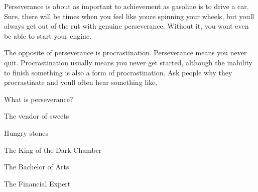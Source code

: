 \begin{questions}
{Perseverance is about as important to achievement as gasoline is to drive a car. Sure, there will be times when you feel like you\textquotesingle{}re spinning your wheels, but you\textquotesingle{}ll always get out of the rut with genuine perseverance. Without it, you won\textquotesingle{}t even be able to start your engine.



The opposite of perseverance is procrastination. Perseverance means you never quit. Procrastination usually means you never get started, although the inability to finish something is also a form of procrastination. Ask people why they procrastinate and you\textquotesingle{}ll often hear something like, }

What is perseverance?

\begin{randomizechoices}
\end{randomizechoices}


\begin{randomizeoneparchoices}
\end{randomizeoneparchoices}


\begin{tcolorbox}
\begin{smallroman}
\item The vendor of sweets
\item Hungry stones
\item The King of the Dark Chamber
\item The Bachelor of Arts
\item The Financial Expert
\end{smallroman}
\end{tcolorbox}


\end{questions}
